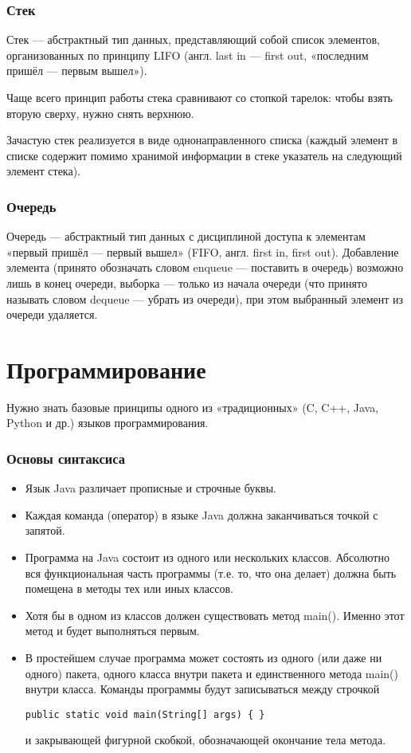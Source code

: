 \documentclass[12pt]{matmex-diploma}
\begin{document}
        \subsubsection*{Стек}
            Стек — абстрактный тип данных, представляющий собой список элементов, организованных по принципу LIFO (англ. last in — first out, «последним пришёл — первым вышел»).

            Чаще всего принцип работы стека сравнивают со стопкой тарелок: чтобы взять вторую сверху, нужно снять верхнюю.
            
            Зачастую стек реализуется в виде однонаправленного списка (каждый элемент в списке содержит помимо хранимой информации в стеке указатель на следующий элемент стека).
            
        \subsubsection*{Очередь}
            Очередь — абстрактный тип данных с дисциплиной доступа к элементам «первый пришёл — первый вышел» (FIFO, англ. first in, first out). Добавление элемента (принято обозначать словом enqueue — поставить в очередь) возможно лишь в конец очереди, выборка — только из начала очереди (что принято называть словом dequeue — убрать из очереди), при этом выбранный элемент из очереди удаляется.
            
\section{Программирование}     

    Нужно знать базовые принципы одного из «традиционных» (C, C++, Java, Python и др.) языков программирования.
    
    \subsubsection*{Основы синтаксиса}
        \begin{itemize}
            \item Язык Java различает прописные и строчные буквы.
            \item Каждая команда (оператор) в языке Java должна заканчиваться точкой с запятой.
            \item Программа на Java состоит из одного или нескольких классов. Абсолютно вся функциональная часть программы (т.е. то, что она делает) должна быть помещена в методы тех или иных классов.
            \item Хотя бы в одном из классов должен существовать метод main(). Именно этот метод и будет выполняться первым.
            \item В простейшем случае программа может состоять из одного (или даже ни одного) пакета, одного класса внутри пакета и единственного метода main() внутри класса. Команды программы будут записываться между строчкой         \begin{verbatim}
public static void main(String[] args) { }
		        \end{verbatim} 
		        и закрывающей фигурной скобкой, обозначающей окончание тела метода.
        \end{itemize}
\end{document}
